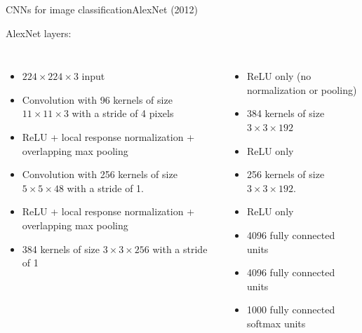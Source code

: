\documentclass[aspectratio=169]{beamer}
\begin{document}
\begin{frame}{CNNs for image classification}{AlexNet (2012)}

  AlexNet layers:
  \begin{columns}
  \column{2.7in}
  \begin{itemize}
  \item $224 \times 224 \times 3$ input
  \item Convolution with 96 kernels of size $11 \times 11 \times 3$ with a stride of 4 pixels
  \item ReLU + local response normalization + overlapping max pooling
  \item Convolution with 256 kernels of size $5\times 5\times 48$ with a stride of 1.
  \item ReLU + local response normalization + overlapping max pooling
  \item 384 kernels of size $3\times 3\times 256$ with a stride of 1
  \end{itemize}
  \column{2.3in}
  \begin{itemize}
  \item ReLU only (no normalization or pooling)
  \item 384 kernels of size $3\times 3\times 192$
  \item ReLU only
  \item 256 kernels of size $3\times 3\times 192$.
  \item ReLU only
  \item 4096 fully connected units
  \item 4096 fully connected units
  \item 1000 fully connected softmax units
  \end{itemize}
  \end{columns}
  
\end{frame}
\end{document}

